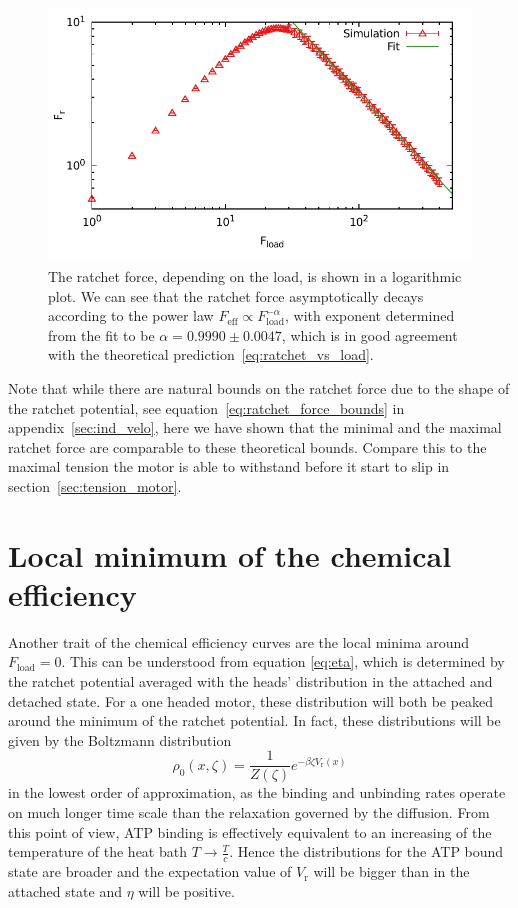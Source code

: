 \documentclass[aps,pre,twocolumn,showpacs,showkeys,superscriptaddress,floatfix]{revtex4-1}
\begin{document}
\begin{figure}[t]
\centering
\includegraphics[width=0.9\linewidth,height=!]{ratchet_force_decay}
\caption{
\label{fig:ratchet_force_decay}
The ratchet force, depending on the load, is shown in a logarithmic plot. 
We can see that the ratchet force asymptotically decays according to the power law $F_\text{eff} \propto F_\text{load}^{-\alpha}$, 
with exponent determined from the fit to be $\alpha = 0.9990 \pm 0.0047$, 
which is in good agreement with the theoretical prediction~\eqref{eq:ratchet_vs_load}.
}
\end{figure}

Note that while there are natural bounds on the ratchet force due to the shape of the ratchet potential, 
see equation~\eqref{eq:ratchet_force_bounds} in appendix~\ref{sec:ind_velo}, 
here we have shown that the minimal and the maximal ratchet force are comparable to these theoretical bounds. 
Compare this to the maximal tension the motor is able to withstand before it start to slip in section~\ref{sec:tension_motor}. 


\section{Local minimum of the chemical efficiency}
\label{sec:local_minimum}
Another trait of the chemical efficiency curves are the local minima around $F_\text{load}=0$. 
This can be understood from equation \eqref{eq:eta}, which is determined by the ratchet potential averaged with the heads' distribution in the attached and detached state. 
For a one headed motor, these distribution will both be peaked around the minimum of the ratchet potential. 
In fact, these distributions will be given by the Boltzmann distribution
\begin{equation*}
\rho_0(x,\zeta) = \frac{1}{Z(\zeta)} e^{-\beta \zeta V_\text{r}(x)}
\end{equation*} 
in the lowest order of approximation, as the binding and unbinding rates operate on much longer time scale than the relaxation governed by the diffusion. 
From this point of view, ATP binding is effectively equivalent to an increasing of the temperature of the heat bath $T\rightarrow\frac{T}{c}$. 
Hence the distributions for the ATP bound state are broader and the expectation value of $V_\text{r}$ will be bigger than in the attached state and $\eta$ will be positive. 
\end{document}
